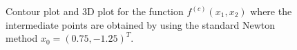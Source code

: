 \documentclass[a4paper,11pt]{article}
\begin{document}
	\begin{figure}[h!]
		\centering
		 \quad
		\caption{Contour plot and 3D plot for the function $f^{(c)}(x_{1},x_{2})$ where the intermediate points are obtained by using the standard Newton method $x_{0}=(0.75,-1.25)^{T}$.}
		\label{Fig:func_c}
	\end{figure}
\end{document}
